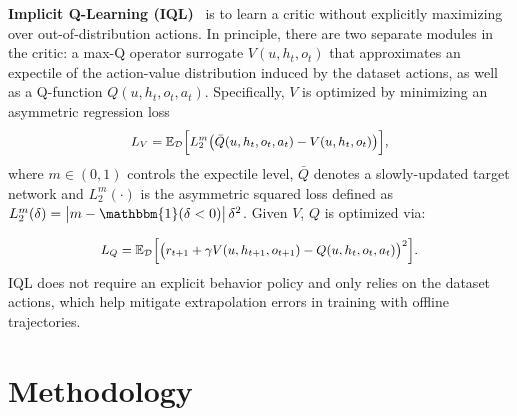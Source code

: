 \documentclass{article}
\theoremstyle{plain}
\theoremstyle{definition}
\theoremstyle{remark}
\begin{document}
\textbf{Implicit Q-Learning (IQL)}~\cite{kostrikov2022offline} is to learn a critic without explicitly maximizing over out-of-distribution actions. In principle, there are two separate modules in the critic: a max-Q operator surrogate $V(u, h_t, o_t)$ that approximates an expectile of the
action-value distribution induced by the dataset actions, as well as a Q-function $Q(u, h_t, o_t, a_t)$. Specifically, $V$ is optimized
by minimizing an asymmetric  regression loss 
\begin{equation}
\small
\begin{array}{cc}
L_V =\mathbb{E}_{\mathcal{D}}\Big[
L_2^m\big(\bar{Q}(u, h_t, o_t, a_t) - V(u, h_t, o_t)\big)
\Big],
\end{array}
\label{eq:iql_v}
\end{equation}
where $m\in(0,1)$ controls the expectile level, $\bar{Q}$ denotes a slowly-updated
target network and $L_2^m(\cdot)$ is the asymmetric squared loss defined as
$L_2^m(\delta)=\big|m - \mathbbm{1}(\delta < 0)\big|\,\delta^2$.
Given $V$, $Q$ is optimized via:

\begin{equation}
\small
\begin{array}{l}
L_Q =
\mathbb{E}_{\mathcal{D}}
\Big[ \big(r_{t+1} +
 \gamma V(u, h_{t+1}, o_{t+1}) - Q(u, h_t, o_t, a_t)\big)^2
\Big].
\label{eq:iql_q}
\end{array}
\end{equation}
IQL does not require an explicit behavior policy and only relies on the dataset
actions, which help mitigate extrapolation errors in training with offline trajectories.






\section{Methodology}
\end{document}
